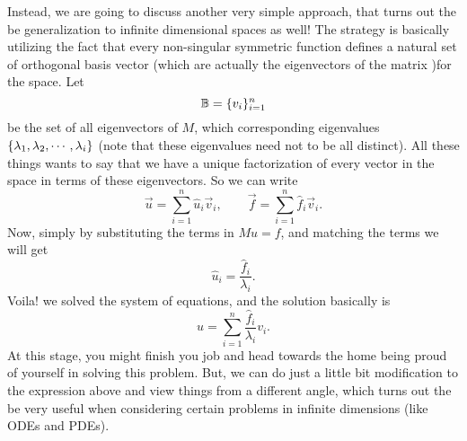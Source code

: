 Instead, we are going to discuss another very simple approach, that turns out the be generalization to infinite dimensional spaces as well! The strategy is basically utilizing the fact that every non-singular symmetric function defines a natural set of orthogonal basis vector (which are actually the eigenvectors of the matrix )for the space. Let 
\[ \mathbb{B} = \{v_i\}_{i=1}^{n} \]
be the set of all eigenvectors of $M$, which corresponding eigenvalues $\{\lambda_1, \lambda_2, \cdots, \lambda_i\}$ (note that these eigenvalues need not to be all distinct). All these things wants to say that we have a unique factorization of every vector in the space in terms of these eigenvectors. So we can write
\[ \vec{u} = \sum_{i=1}^{n} \hat{u}_i \vec{v}_i, \qquad \vec{f} = \sum_{i=1}^{n} \hat{f}_i \vec{v}_i.   \]
Now, simply by substituting the terms in $Mu = f$, and matching the terms we will get
\[  \hat{u}_i = \frac{\hat{f}_i}{\lambda_i}.  \] 
Voila! we solved the system of equations, and the solution basically is
\[ u = \sum_{i=1}^{n} \frac{\hat{f}_i}{\lambda_i} v_i. \]
At this stage, you might finish you job and head towards the home being proud of yourself in solving this problem. But, we can do just a little bit modification to the expression above and view things from a different angle, which turns out the be very useful when considering certain problems in infinite dimensions (like ODEs and PDEs).































